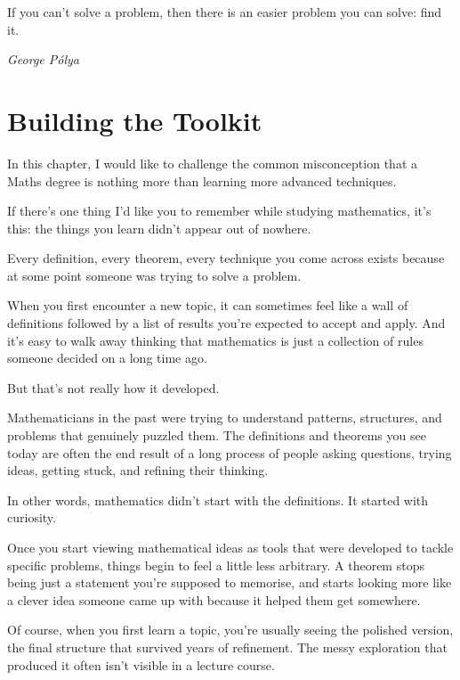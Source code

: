 \epigraph{If you can't solve a problem, then there is an easier problem you can solve: find it.}
{\textit{George Pólya}}


\section{Building the Toolkit}


In this chapter, I would like to challenge the common misconception that a Maths degree is nothing more than learning more advanced techniques.

If there’s one thing I’d like you to remember while studying mathematics, it’s this: the things you learn didn’t appear out of nowhere.

Every definition, every theorem, every technique you come across exists because at some point someone was trying to solve a problem.

When you first encounter a new topic, it can sometimes feel like a wall of definitions followed by a list of results you’re expected to accept and apply. And it’s easy to walk away thinking that mathematics is just a collection of rules someone decided on a long time ago.

But that’s not really how it developed.

Mathematicians in the past were trying to understand patterns, structures, and problems that genuinely puzzled them. The definitions and theorems you see today are often the end result of a long process of people asking questions, trying ideas, getting stuck, and refining their thinking.

In other words, mathematics didn’t start with the definitions. It started with curiosity.

Once you start viewing mathematical ideas as tools that were developed to tackle specific problems, things begin to feel a little less arbitrary. A theorem stops being just a statement you’re supposed to memorise, and starts looking more like a clever idea someone came up with because it helped them get somewhere.

Of course, when you first learn a topic, you’re usually seeing the polished version, the final structure that survived years of refinement. The messy exploration that produced it often isn’t visible in a lecture course. 


